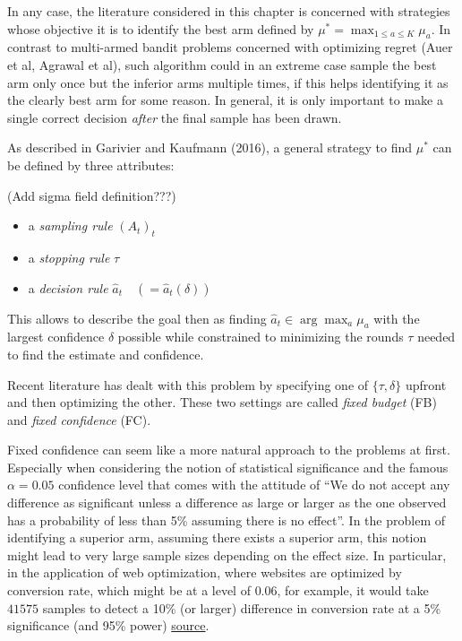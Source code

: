 \documentclass[12pt,]{article}
\providecommand{\tightlist}{%
  \setlength{\itemsep}{0pt}\setlength{\parskip}{0pt}}
\begin{document}
In any case, the literature considered in this chapter is concerned with
strategies whose objective it is to identify the best arm defined by
\(\mu^* = \max_{1\leq a \leq K} \mu_a\). In contrast to multi-armed
bandit problems concerned with optimizing regret (Auer et al, Agrawal et
al), such algorithm could in an extreme case sample the best arm only
once but the inferior arms multiple times, if this helps identifying it
as the clearly best arm for some reason. In general, it is only
important to make a single correct decision \emph{after} the final
sample has been drawn.

As described in Garivier and Kaufmann (2016), a general strategy to find
\(\mu^*\) can be defined by three attributes:

(Add sigma field definition???)

\begin{itemize}
\tightlist
\item
  a \emph{sampling rule} \((A_t)_t\)
\item
  a \emph{stopping rule} \(\tau\)
\item
  a \emph{decision rule} \(\hat{a}_t \quad (=\hat{a}_t(\delta))\)
\end{itemize}

This allows to describe the goal then as finding
\(\hat{a}_t \in \arg \max_a \mu_a\) with the largest confidence
\(\delta\) possible while constrained to minimizing the rounds \(\tau\)
needed to find the estimate and confidence.

Recent literature has dealt with this problem by specifying one of
\(\{\tau, \delta\}\) upfront and then optimizing the other. These two
settings are called \emph{fixed budget} (FB) and \emph{fixed confidence}
(FC).

Fixed confidence can seem like a more natural approach to the problems
at first. Especially when considering the notion of statistical
significance and the famous \(\alpha = 0.05\) confidence level that
comes with the attitude of ``We do not accept any difference as
significant unless a difference as large or larger as the one observed
has a probability of less than 5\% assuming there is no effect''. In the
problem of identifying a superior arm, assuming there exists a superior
arm, this notion might lead to very large sample sizes depending on the
effect size. In particular, in the application of web optimization,
where websites are optimized by conversion rate, which might be at a
level of \(0.06\), for example, it would take \(41575\) samples to
detect a 10\% (or larger) difference in conversion rate at a 5\%
significance (and 95\% power)
\href{http://www.evanmiller.org/ab-testing/sample-size.html\#!6;95;5;10;1}{source}.
\end{document}
